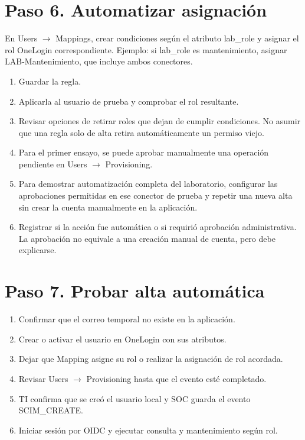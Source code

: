 \documentclass[12pt,a4paper]{article}
\begin{document}
\section*{Paso 6. Automatizar asignación}
En Users \(\rightarrow\) Mappings, crear condiciones según el atributo \textnormal{lab\_\allowbreak{}role} y asignar el rol OneLogin correspondiente. Ejemplo: si \textnormal{lab\_\allowbreak{}role} es \textnormal{mantenimiento}, asignar \textnormal{LAB-Mantenimiento}, que incluye ambos conectores.\par
\begin{enumerate}
\item Guardar la regla.
\item Aplicarla al usuario de prueba y comprobar el rol resultante.
\item Revisar opciones de retirar roles que dejan de cumplir condiciones. No asumir que una regla solo de alta retira automáticamente un permiso viejo.
\item Para el primer ensayo, se puede aprobar manualmente una operación pendiente en Users \(\rightarrow\) Provisioning.
\item Para demostrar automatización completa del laboratorio, configurar las aprobaciones permitidas en ese conector de prueba y repetir una nueva alta sin crear la cuenta manualmente en la aplicación.
\item Registrar si la acción fue automática o si requirió aprobación administrativa. La aprobación no equivale a una creación manual de cuenta, pero debe explicarse.
\end{enumerate}
\section*{Paso 7. Probar alta automática}
\begin{enumerate}
\item Confirmar que el correo temporal no existe en la aplicación.
\item Crear o activar el usuario en OneLogin con sus atributos.
\item Dejar que Mapping asigne su rol o realizar la asignación de rol acordada.
\item Revisar Users \(\rightarrow\) Provisioning hasta que el evento esté completado.
\item TI confirma que se creó el usuario local y SOC guarda el evento \textnormal{SCIM\_\allowbreak{}CREATE}.
\item Iniciar sesión por OIDC y ejecutar consulta y mantenimiento según rol.
\end{enumerate}
\end{document}
